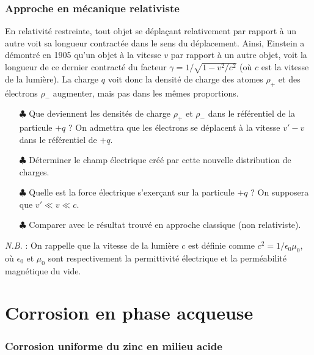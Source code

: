 \documentclass{report}
\begin{document}
\subsubsection*{Approche en mécanique relativiste}

En relativité restreinte, tout objet se déplaçant relativement par rapport à un autre voit sa longueur contractée dans le sens du déplacement. Ainsi, Einstein a démontré en 1905 qu'un objet à la vitesse $v$ par rapport à un autre objet, voit la longueur de ce dernier contracté du facteur $\gamma=1/\sqrt{1-v^{2}/c^{2}}$ (où $c$ est la vitesse de la lumière). La charge $q$ voit donc la densité de charge des atomes $\rho_+$ et des électrons $\rho_-$ augmenter, mais pas dans les mêmes proportions. 
	\begin{itemize}
		\item[$\clubsuit$] Que deviennent les densités de charge $\rho_{+}$ et $\rho_{-}$ dans le référentiel de la particule $+q$ ? On admettra que les électrons se déplacent à la vitesse $v'-v$ dans le référentiel de $+q$. 
		\item[$\clubsuit$] Déterminer le champ électrique créé par cette nouvelle distribution de charges. 
		\item[$\clubsuit$] Quelle est la force électrique s'exerçant sur la particule $+q$ ? On supposera que $v'\ll v\ll c$.
		\item[$\clubsuit$] Comparer avec le résultat trouvé en approche classique (non relativiste).
	\end{itemize}
			
\textit{N.B.} : On rappelle que la vitesse de la lumière $c$ est définie comme $c^{2}=1/\epsilon_{0}\mu_{0}$, où $\epsilon_{0}$ et $\mu_{0}$ sont respectivement la permittivité électrique et la perméabilité magnétique du vide.

\newpage

\section*{Corrosion en phase acqueuse}

\subsubsection*{Corrosion uniforme du zinc en milieu acide}
\end{document}
